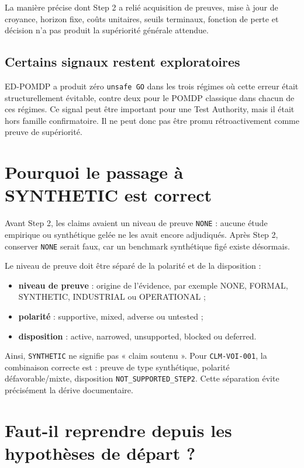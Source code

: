 \documentclass[11pt,a4paper]{article}
\begin{document}
La manière précise dont Step 2 a relié acquisition de preuves, mise à jour de croyance, horizon fixe, coûts unitaires, seuils terminaux, fonction de perte et décision n'a pas produit la supériorité générale attendue.

\subsection{Certains signaux restent exploratoires}

ED-POMDP a produit zéro \texttt{unsafe GO} dans les trois régimes où cette erreur était structurellement évitable, contre deux pour le POMDP classique dans chacun de ces régimes. Ce signal peut être important pour une Test Authority, mais il était hors famille confirmatoire. Il ne peut donc pas être promu rétroactivement comme preuve de supériorité.

\section{Pourquoi le passage à SYNTHETIC est correct}

Avant Step 2, les claims avaient un niveau de preuve \texttt{NONE} : aucune étude empirique ou synthétique gelée ne les avait encore adjudiqués. Après Step 2, conserver \texttt{NONE} serait faux, car un benchmark synthétique figé existe désormais.

Le niveau de preuve doit être séparé de la polarité et de la disposition :
\begin{itemize}
  \item \textbf{niveau de preuve} : origine de l'évidence, par exemple NONE, FORMAL, SYNTHETIC, INDUSTRIAL ou OPERATIONAL ;
  \item \textbf{polarité} : supportive, mixed, adverse ou untested ;
  \item \textbf{disposition} : active, narrowed, unsupported, blocked ou deferred.
\end{itemize}

Ainsi, \texttt{SYNTHETIC} ne signifie pas « claim soutenu ». Pour \texttt{CLM-VOI-001}, la combinaison correcte est : preuve de type synthétique, polarité défavorable/mixte, disposition \texttt{NOT\_SUPPORTED\_STEP2}. Cette séparation évite précisément la dérive documentaire.

\section{Faut-il reprendre depuis les hypothèses de départ ?}
\end{document}
